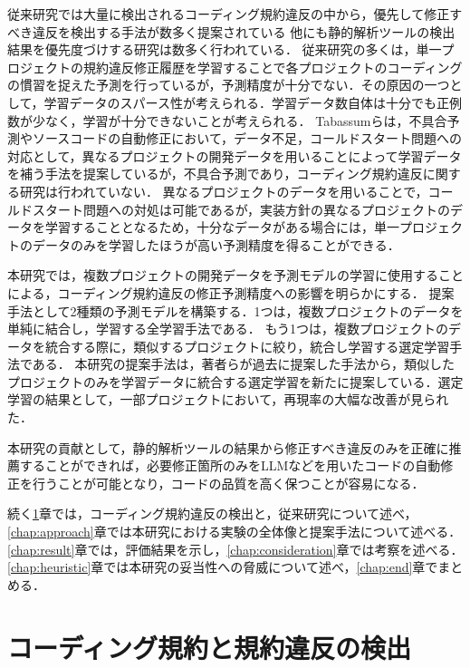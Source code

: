 \documentclass[paper]{ieicej}
\newcommand{\todo}[1]{\colorbox{yellow}{{\bf TODO}:}{\color{red} {\textbf{[#1]}}}}
\begin{document}
従来研究では大量に検出されるコーディング規約違反の中から，優先して修正すべき違反を検出する手法が数多く提案されている\cite{JyuraiPre}
他にも静的解析ツールの検出結果を優先度づけする研究は数多く行われている．
従来研究の多くは，単一プロジェクトの規約違反修正履歴を学習することで各プロジェクトのコーディングの慣習を捉えた予測を行っているが，予測精度が十分でない．その原因の一つとして，学習データのスパース性が考えられる．学習データ数自体は十分でも正例数が少なく，学習が十分できないことが考えられる．
Tabassumらは，不具合予測やソースコードの自動修正において，データ不足，コールドスタート問題への対応として，異なるプロジェクトの開発データを用いることによって学習データを補う手法を提案しているが，不具合予測であり，コーディング規約違反に関する研究は行われていない\cite{Tabassum}．
異なるプロジェクトのデータを用いることで，コールドスタート問題への対処は可能であるが，実装方針の異なるプロジェクトのデータを学習することとなるため，十分なデータがある場合には，単一プロジェクトのデータのみを学習したほうが高い予測精度を得ることができる．

本研究では，複数プロジェクトの開発データを予測モデルの学習に使用することによる，コーディング規約違反の修正予測精度への影響を明らかにする．
提案手法として2種類の予測モデルを構築する．1つは，複数プロジェクトのデータを単純に結合し，学習する全学習手法である．
もう1つは，複数プロジェクトのデータを統合する際に，類似するプロジェクトに絞り，統合し学習する選定学習手法である．
本研究の提案手法は，著者らが過去に提案した手法から，類似したプロジェクトのみを学習データに統合する選定学習を新たに提案している\cite{mine}\cite{mine_live}．選定学習の結果として，一部プロジェクトにおいて，再現率の大幅な改善が見られた．

本研究の貢献として，静的解析ツールの結果から修正すべき違反のみを正確に推薦することができれば，必要修正箇所のみをLLMなどを用いたコードの自動修正を行うことが可能となり，コードの品質を高く保つことが容易になる．

続く\ref{chap:background}章では，コーディング規約違反の検出と，従来研究について述べ，\ref{chap:approach}章では本研究における実験の全体像と提案手法について述べる．\ref{chap:result}章では，評価結果を示し，\ref{chap:consideration}章では考察を述べる．\ref{chap:heuristic}章では本研究の妥当性への脅威について述べ，\ref{chap:end}章でまとめる．

\section{コーディング規約と規約違反の検出}\label{chap:background}
\end{document}
